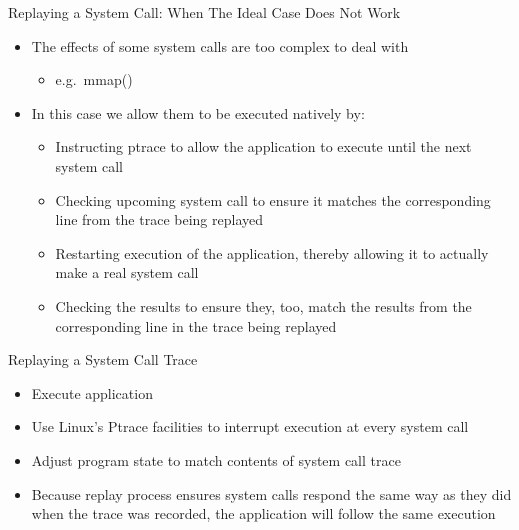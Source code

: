 \documentclass[pdf]{beamer}
\begin{document}
\begin{frame}{Replaying a System Call: When The Ideal Case Does Not Work}
  \begin{itemize}
  \item{The effects of some system calls are too complex to deal with}
    \begin{itemize}
    \item{e.g.\ mmap()}
    \end{itemize}
  \item{In this case we allow them to be executed natively by:}
    \begin{itemize}
      \item{Instructing ptrace to allow the application to execute until the
          next system call}
      \item{Checking upcoming system call to ensure it matches the corresponding
          line from the trace being replayed}
      \item{Restarting execution of the application, thereby allowing it to
          actually make a real system call}
      \item{Checking the results to ensure they, too, match the results from the
          corresponding line in the trace being replayed}
    \end{itemize}
  \end{itemize}
\end{frame}


\begin{frame}{Replaying a System Call Trace}
  \begin{itemize}
  \item{Execute application}
  \item{Use Linux's Ptrace facilities to interrupt execution at every system
      call}
  \item{Adjust program state to match contents of system call trace}
  \item{Because replay process ensures system calls respond the same way as they
      did when the trace was recorded, the application will follow the same
      execution}
  \end{itemize}
\end{frame}
\end{document}
